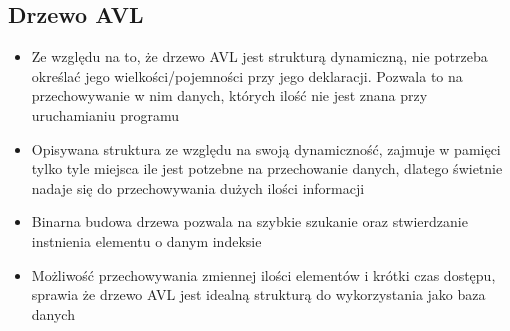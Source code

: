 \documentclass[]{article}
\begin{document}
	\subsection{Drzewo AVL}
		\begin{itemize}
			\item Ze względu na to, że drzewo AVL jest strukturą dynamiczną, nie potrzeba określać jego wielkości/pojemności przy jego deklaracji. Pozwala to na przechowywanie w nim danych, których ilość nie jest znana przy uruchamianiu programu
			
			\item Opisywana struktura ze względu na swoją dynamiczność, zajmuje w pamięci tylko tyle miejsca ile jest potzebne na przechowanie danych, dlatego świetnie nadaje się do przechowywania dużych ilości informacji
			
			\item Binarna budowa drzewa pozwala na szybkie szukanie oraz stwierdzanie instnienia elementu o danym indeksie
			
			\item Możliwość przechowywania zmiennej ilości elementów i krótki czas dostępu, sprawia że drzewo AVL jest idealną strukturą do wykorzystania jako baza danych
		\end{itemize}
\pagebreak
\tableofcontents
\end{document}

